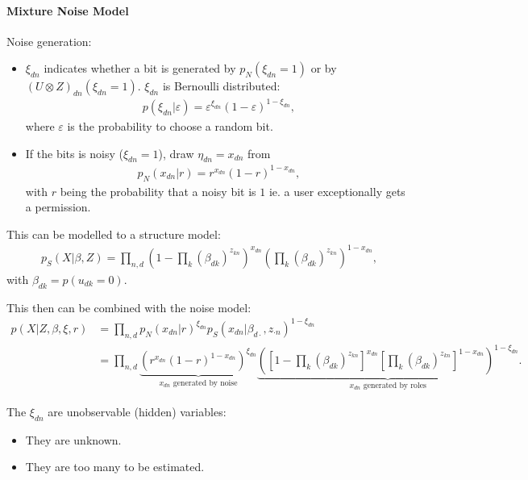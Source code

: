 \paragraph{Mixture Noise Model} Noise generation:
\begin{itemize}
    \item $\xi_{dn}$ indicates whether a bit is generated by $p_N (\xi_{dn}=1)$ or by $(U\otimes Z)_{dn}(\xi_{dn}=1)$. $\xi_{dn}$ is Bernoulli distributed:
    \begin{align*}
        p(\xi_{dn}|\varepsilon) = \varepsilon^{\xi_{dn}} (1-\varepsilon)^{1-\xi_{dn}},
    \end{align*}
    where $\varepsilon$ is the probability to choose a random bit.
    \item If the bits is noisy ($\xi_{dn}=1$), draw $\eta_{dn} = x_{dn}$ from
    \begin{align*}
        p_N(x_{dn}|r) = r^{x_{dn}} (1-r)^{1-x_{dn}},
    \end{align*}
    with $r$ being the probability that a noisy bit is $1$ ie. a user exceptionally gets a permission.
\end{itemize}
This can be modelled to a structure model:
\begin{align*}
    p_S(X|\beta, Z) = \prod_{n,d} \left( 1-\prod_k (\beta_{dk})^{z_{kn}}\right)^{x_{dn}} \left( \prod_k (\beta_{dk})^{z_{kn}}\right)^{1-x_{dn}},
\end{align*}
with $\beta_{dk}=p(u_{dk}=0)$.

This then can be combined with the noise model:
\begin{align*}
    p(X|Z, \beta, \xi, r) &= \prod_{n,d} p_N(x_{dn}|r)^{\xi_{dn}} p_S(x_{dn}|\beta_{d\cdot}, z_{\cdot n})^{1-\xi_{dn}}\\ 
    &= \prod_{n,d} \underbrace{\left( r^{x_{dn}}(1-r)^{1-x_{dn}}\right)^{\xi_{dn}}}_{x_{dn}\text{ generated by noise}}
    \underbrace{
        \left(\left[1-\prod_k (\beta_{dk})^{z_{kn}}\right]^{x_{dn}} 
            \left[ \prod_k(\beta_{dk})^{z_{kn}} \right]^{1-x_{dn}}
        \right)^{1-\xi_{dn}}
    }_{x_{dn}\text{ generated by roles}}.
\end{align*}

The $\xi_{dn}$ are unobservable (hidden) variables:
\begin{itemize}
\item They are unknown.
\item They are too many to be estimated.
\end{itemize}

